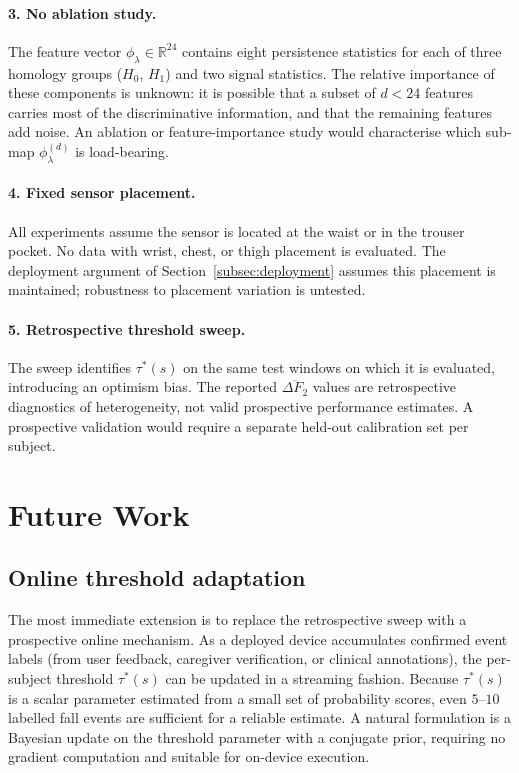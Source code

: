 \documentclass[onluarkali,ingilizce,yukseklisans,karton,LisansustuEgitim]{itutez}
\providecommand{\R}{\mathbb{R}}
\providecommand{\1}{\mathbf{1}}
\begin{document}
\paragraph{3. No ablation study.}
The feature vector $\phi_\lambda\in\R^{24}$ contains eight persistence statistics
for each of three homology groups ($H_0$, $H_1$) and two signal statistics.  The
relative importance of these components is unknown: it is possible that a subset of
$d<24$ features carries most of the discriminative information, and that the
remaining features add noise.  An ablation or feature-importance study would
characterise which sub-map $\phi_\lambda^{(d)}$ is load-bearing.

\paragraph{4. Fixed sensor placement.}
All experiments assume the sensor is located at the waist or in the trouser pocket.
No data with wrist, chest, or thigh placement is evaluated.  The deployment argument
of Section~\ref{subsec:deployment} assumes this placement is maintained; robustness
to placement variation is untested.

\paragraph{5. Retrospective threshold sweep.}
The sweep identifies $\tau^*(s)$ on the same test windows on which it is evaluated,
introducing an optimism bias.  The reported $\overline{\Delta F_2}$ values are
retrospective diagnostics of heterogeneity, not valid prospective performance
estimates.  A prospective validation would require a separate held-out calibration
set per subject.

\section{Future Work}
\label{subsec:future-work}

\subsection{Online threshold adaptation}

The most immediate extension is to replace the retrospective sweep with a prospective
online mechanism.  As a deployed device accumulates confirmed event labels (from user
feedback, caregiver verification, or clinical annotations), the per-subject threshold
$\tau^*(s)$ can be updated in a streaming fashion.  Because $\tau^*(s)$ is a scalar
parameter estimated from a small set of probability scores, even $5$--$10$ labelled
fall events are sufficient for a reliable estimate.  A natural formulation is a
Bayesian update on the threshold parameter with a conjugate prior, requiring no
gradient computation and suitable for on-device execution.
\end{document}
